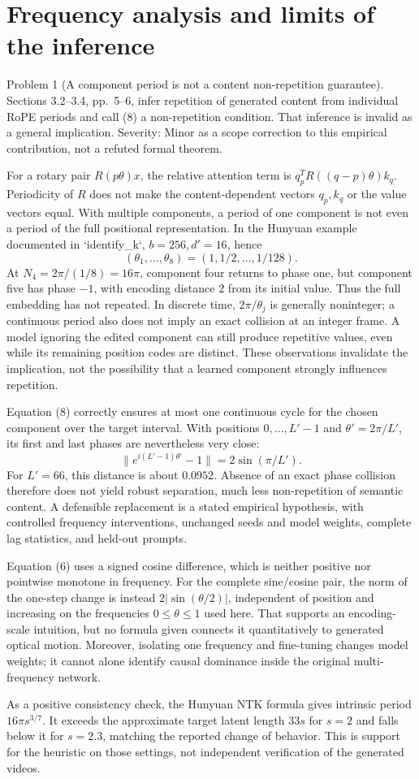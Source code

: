 \documentclass[10pt]{article}
\begin{document}
\section*{Frequency analysis and limits of the inference}
Problem 1 (A component period is not a content non-repetition guarantee).  Sections 3.2–3.4, pp. 5–6, infer repetition of generated content from individual RoPE periods and call (8) a non-repetition condition. That inference is invalid as a general implication. Severity: Minor as a scope correction to this empirical contribution, not a refuted formal theorem.\par
For a rotary pair \(R(p\theta)x\), the relative attention term is \(q_p^TR((q-p)\theta)k_q\). Periodicity of \(R\) does not make the content-dependent vectors \(q_p,k_q\) or the value vectors equal. With multiple components, a period of one component is not even a period of the full positional representation. In the Hunyuan example documented in `identify\_k`, \(b=256,d'=16\), hence \[(\theta_1,\ldots,\theta_8)=(1,1/2,\ldots,1/128).\] At \(N_4=2\pi/(1/8)=16\pi\), component four returns to phase one, but component five has phase \(-1\), with encoding distance \(2\) from its initial value. Thus the full embedding has not repeated. In discrete time, \(2\pi/\theta_j\) is generally noninteger; a continuous period also does not imply an exact collision at an integer frame. A model ignoring the edited component can still produce repetitive values, even while its remaining position codes are distinct. These observations invalidate the implication, not the possibility that a learned component strongly influences repetition.\par
Equation (8) correctly ensures at most one continuous cycle for the chosen component over the target interval. With positions \(0,\ldots,L'-1\) and \(\theta'=2\pi/L'\), its first and last phases are nevertheless very close: \[\|e^{i(L'-1)\theta'}-1\|=2\sin(\pi/L').\] For \(L'=66\), this distance is about \(0.0952\). Absence of an exact phase collision therefore does not yield robust separation, much less non-repetition of semantic content. A defensible replacement is a stated empirical hypothesis, with controlled frequency interventions, unchanged seeds and model weights, complete lag statistics, and held-out prompts.\par
Equation (6) uses a signed cosine difference, which is neither positive nor pointwise monotone in frequency. For the complete sine/cosine pair, the norm of the one-step change is instead \(2|\sin(\theta/2)|\), independent of position and increasing on the frequencies \(0\leq\theta\leq1\) used here. That supports an encoding-scale intuition, but no formula given connects it quantitatively to generated optical motion. Moreover, isolating one frequency and fine-tuning changes model weights; it cannot alone identify causal dominance inside the original multi-frequency network.\par
As a positive consistency check, the Hunyuan NTK formula gives intrinsic period \(16\pi s^{3/7}\). It exceeds the approximate target latent length \(33s\) for \(s=2\) and falls below it for \(s=2.3\), matching the reported change of behavior. This is support for the heuristic on those settings, not independent verification of the generated videos.\par
\end{document}
